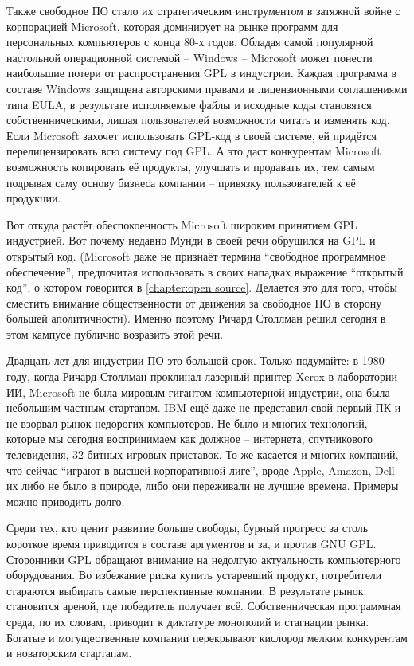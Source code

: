 Также свободное ПО стало их стратегическим инструментом в затяжной войне с корпорацией Microsoft, которая доминирует на рынке программ для персональных компьютеров с конца 80-х годов. Обладая самой популярной настольной операционной системой -- Windows -- Microsoft может понести наибольшие потери от распространения GPL в индустрии. Каждая программа в составе Windows защищена авторскими правами и лицензионными соглашениями типа EULA, в результате исполняемые файлы и исходные коды становятся собственническими, лишая пользователей возможности читать и изменять код. Если Microsoft захочет использовать GPL-код в своей системе, ей придётся перелицензировать всю систему под GPL. А это даст конкурентам Microsoft возможность копировать её продукты, улучшать и продавать их, тем самым подрывая саму основу бизнеса компании -- привязку пользователей к её продукции.

Вот откуда растёт обеспокоенность Microsoft широким принятием GPL индустрией. Вот почему недавно Мунди в своей речи обрушился на GPL и открытый код. (Microsoft даже не признаёт термина ``свободное программное обеспечение'', предпочитая использовать в своих нападках выражение ``открытый код'', о котором говорится в \autoref{chapter:open source}. Делается это для того, чтобы сместить внимание общественности от движения за свободное ПО в сторону большей аполитичности). Именно поэтому Ричард Столлман решил сегодня в этом кампусе публично возразить этой речи.

Двадцать лет для индустрии ПО это большой срок. Только подумайте: в 1980 году, когда Ричард Столлман проклинал лазерный принтер Xerox в лаборатории ИИ, Microsoft не была мировым гигантом компьютерной индустрии, она была небольшим частным стартапом. IBM ещё даже не представил свой первый ПК и не взорвал рынок недорогих компьютеров. Не было и многих технологий, которые мы сегодня воспринимаем как должное -- интернета, спутникового телевидения, 32-битных игровых приставок. То же касается и многих компаний, что сейчас ``играют в высшей корпоративной лиге'', вроде Apple, Amazon, Dell -- их либо не было в природе, либо они переживали не лучшие времена. Примеры можно приводить долго.

Среди тех, кто ценит развитие больше свободы, бурный прогресс за столь короткое время приводится в составе аргументов и за, и против GNU GPL. Сторонники GPL обращают внимание на недолгую актуальность компьютерного оборудования. Во избежание риска купить устаревший продукт, потребители стараются выбирать самые перспективные компании. В результате рынок становится ареной, где победитель получает всё.  Собственническая программная среда, по их словам, приводит к диктатуре монополий и стагнации рынка. Богатые и могущественные компании перекрывают кислород мелким конкурентам и новаторским стартапам.

